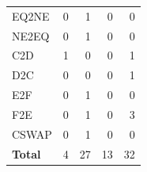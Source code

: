 \begin{tabular}{lrrrr}
            EQ2NE & 0 & 1 & 0 & 0 \\
            NE2EQ & 0 & 1 & 0 & 0 \\
    \midrule
            C2D & 1 & 0 & 0 & 1 \\
            D2C & 0 & 0 & 0 & 1 \\
    \midrule
            E2F & 0 & 1 & 0 & 0 \\
            F2E & 0 & 1 & 0 & 3 \\
    \midrule
            CSWAP & 0 & 1 & 0 & 0 \\
    \midrule
    \textbf{Total} & 4 & 27 & 13 & 32 \\
    \bottomrule
\end{tabular}
